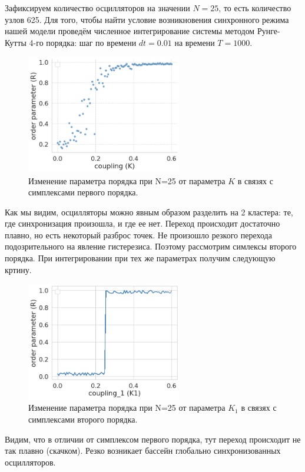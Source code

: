 Зафиксируем количество осцилляторов на значении $N=25$, то есть количество узлов 625.
Для того, чтобы найти условие возникновения синхронного режима нашей модели проведём численное интегрирование системы методом Рунге-Кутты 4-го порядка: шаг по времени $dt=0.01$ на времени $T=1000$.
 \begin{figure}
\center\includegraphics[height=5.2cm]{aRyabovris3.png}
 \caption{Изменение параметра порядка при N=25 от параметра $K $ в  связях с симплексами первого порядка.}
\end{figure}

Как мы видим, осцилляторы можно явным образом разделить на 2 кластера: те, где синхронизация произошла, и где ее нет. Переход происходит достаточно плавно, но есть некоторый разброс точек. Не произошло резкого перехода подозрительного на явление гистерезиса. Поэтому рассмотрим симлексы второго порядка.
При интегрировании при тех же параметрах получим следующую кртину.
 \begin{figure}
\center\includegraphics[height=5.2cm]{aRyabovris2.png}
 \caption{Изменение параметра порядка при N=25 от параметра $K_1$ в  связях с симплексами второго порядка.}
\end{figure}

Видим, что в отличии от симплексом первого порядка, тут переход происходит не так плавно (скачком). Резко возникает бассейн глобально синхронизованных осцилляторов. 

